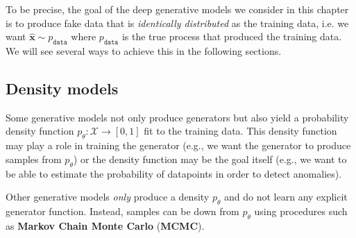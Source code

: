 To be precise, the goal of the deep generative models we consider in this chapter is to produce fake data that is \textit{identically distributed} as the training data, i.e. we want $\hat{\mathbf{x}} \sim p_{\texttt{data}}$ where $p_{\texttt{data}}$ is the true process that produced the training data. We will see several ways to achieve this in the following sections.

\subsection{Density models}
Some generative models not only produce generators but also yield a probability density function $p_{\theta}: \mathcal{X} \rightarrow [0,1]$ fit to the training data. This density function may play a role in training the generator (e.g., we want the generator to produce samples from $p_{\theta}$) or the density function may be the goal itself (e.g., we want to be able to estimate the probability of datapoints in order to detect anomalies).

Other generative models \textit{only} produce a density $p_{\theta}$ and do not learn any explicit generator function. Instead, samples can be down from $p_{\theta}$ using procedures such as \textbf{Markov Chain Monte Carlo} (\textbf{MCMC}).




